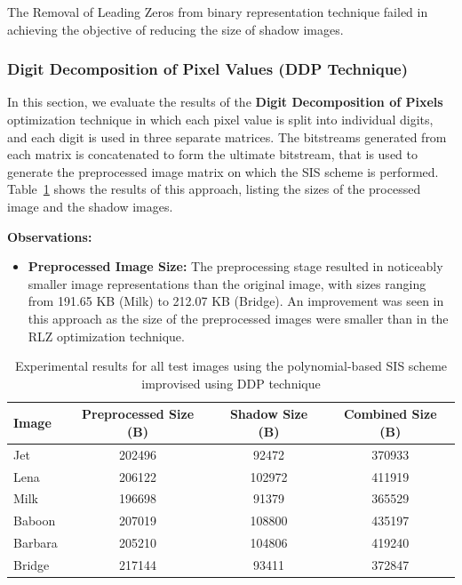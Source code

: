 The Removal of Leading Zeros from binary representation technique failed in achieving the objective of reducing the size of shadow images.
 
\subsubsection{Digit Decomposition of Pixel Values (DDP Technique)}
 
In this section, we evaluate the results of the \textbf{Digit Decomposition of Pixels} optimization technique in which each pixel value is split into individual digits, and each digit is used in three separate matrices. The bitstreams generated from each matrix is concatenated to form the ultimate bitstream, that is used to generate the preprocessed image matrix on which the SIS scheme is performed. Table~\ref{tab:ddp} shows the results of this approach, listing the sizes of the processed image and the shadow images.
 
\textbf{Observations:}
\begin{itemize}
    \item \textbf{Preprocessed Image Size:} The preprocessing stage resulted in noticeably smaller image representations than the original image, with sizes ranging from 191.65 KB (Milk) to 212.07 KB (Bridge). An improvement was seen in this approach as the size of the preprocessed images were smaller than in the RLZ optimization technique.
\end{itemize}
 
\begin{table}[H]
\centering
\small
\setlength{\tabcolsep}{4pt}
\caption{Experimental results for all test images using the polynomial-based SIS scheme improvised using DDP technique}
\label{tab:ddp}
\begin{tabular}{lccc}
\toprule
Image & Preprocessed Size (B) & Shadow Size (B) & Combined Size (B) \\
\midrule
Jet     & 202496 & 92472  & 370933 \\
Lena    & 206122 & 102972 & 411919 \\
Milk    & 196698 & 91379  & 365529 \\
Baboon  & 207019 & 108800 & 435197 \\
Barbara & 205210 & 104806 & 419240 \\
Bridge  & 217144 & 93411  & 372847 \\
\bottomrule
\end{tabular}
\end{table}
 

